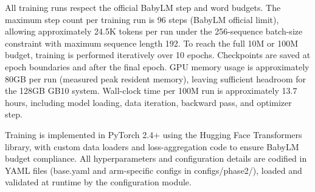 \begin{table}[t]
\centering
\caption{Training configuration: vocabulary 20K, sequence length 192, batch size 256, cosine mask schedule 0.40 to 0.15, Muon, RoPE. Production and mechanism-ablation arms shown.}
\label{tab:training_config_full}
{\footnotesize
{}
}
\end{table}

All training runs respect the official BabyLM step and word budgets. The maximum step count per training run is 96 steps (BabyLM official limit), allowing approximately 24.5K tokens per run under the 256-sequence batch-size constraint with maximum sequence length 192. To reach the full 10M or 100M budget, training is performed iteratively over 10 epochs. Checkpoints are saved at epoch boundaries and after the final epoch. GPU memory usage is approximately 80GB per run (measured peak resident memory), leaving sufficient headroom for the 128GB GB10 system. Wall-clock time per 100M run is approximately 13.7 hours, including model loading, data iteration, backward pass, and optimizer step.

Training is implemented in PyTorch 2.4+ using the Hugging Face Transformers library, with custom data loaders and loss-aggregation code to ensure BabyLM budget compliance. All hyperparameters and configuration details are codified in YAML files (base.yaml and arm-specific configs in configs/phase2/), loaded and validated at runtime by the configuration module.
